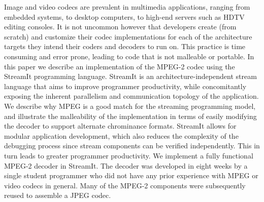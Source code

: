 Image and video codecs are prevalent in multimedia applications,
ranging from embedded systems, to desktop computers, to high-end
servers such as HDTV editing consoles. It is not uncommon however that
developers create (from scratch) and customize their codec
implementations for each of the architecture targets they intend their
coders and decoders to run on. This practice is time consuming and
error prone, leading to code that is not malleable or portable.  In
this paper we describe an implementation of the MPEG-2 codec using the
StreamIt programming language. StreamIt is an architecture-independent
stream language that aims to improve programmer productivity, while
concomitantly exposing the inherent parallelism and communication
topology of the application. We describe why MPEG is a good match for
the streaming programming model, and illustrate the malleability of
the implementation in terms of easily modifying the decoder to support
alternate chrominance formats. StreamIt allows for modular application
development, which also reduces the complexity of the debugging
process since stream components can be verified independently. This in
turn leads to greater programmer productivity.  We implement a fully
functional MPEG-2 decoder in StreamIt. The decoder was developed in
eight weeks by a single student programmer who did not have any prior
experience with MPEG or video codecs in general. Many of the MPEG-2
components were subsequently reused to assemble a JPEG codec.
